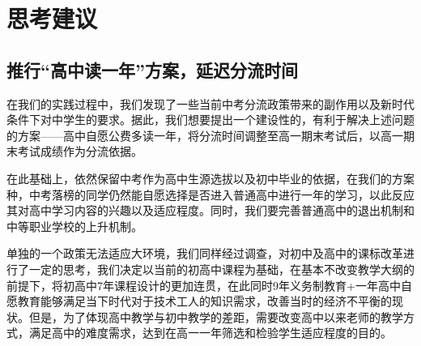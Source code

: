 \documentclass[12pt,UTF8]{ctexart}
\begin{document}
\newpage

\section {思考建议}
\subsection {推行“高中读一年”方案，延迟分流时间}
\par {
	
	在我们的实践过程中，我们发现了一些当前中考分流政策带来的副作用以及新时代条件下对中学生的要求。据此，我们想要提出一个建设性的，有利于解决上述问题的方案——高中自愿公费多读一年，将分流时间调整至高一期末考试后，以高一期末考试成绩作为分流依据。
}
\par {
	
	在此基础上，依然保留中考作为高中生源选拔以及初中毕业的依据，在我们的方案种，中考落榜的同学仍然能自愿选择是否进入普通高中进行一年的学习，以此反应其对高中学习内容的兴趣以及适应程度。同时，我们要完善普通高中的退出机制和中等职业学校的上升机制。
}
\par {
	
	单独的一个政策无法适应大环境，我们同样经过调查，对初中及高中的课标改革进行了一定的思考，我们决定以当前的初高中课程为基础，在基本不改变教学大纲的前提下，将初高中7年课程设计的更加连贯，在此同时9年义务制教育+一年高中自愿教育能够满足当下时代对于技术工人的知识需求，改善当时的经济不平衡的现状。但是，为了体现高中教学与初中教学的差距，需要改变高中以来老师的教学方式，满足高中的难度需求，达到在高一一年筛选和检验学生适应程度的目的。
}
\end{document}
